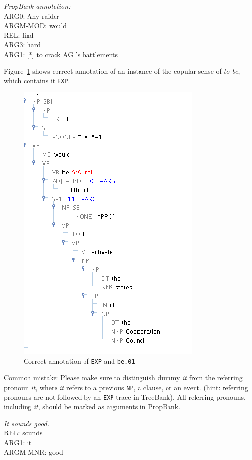 \documentclass[11pt]{report}
\begin{document}
\textit{PropBank annotation:}\\
ARG0:       Any raider\\
ARGM-MOD:   would\\
REL:        	find\\
ARG3:      	 hard\\
ARG1:	     	[*] to crack AG 's battlements\

Figure~\ref{fig: EXP} shows correct annotation of an instance of the copular sense of \textit{to be}, which contains it \texttt{EXP}. 

\begin{figure}[htbp]
\centering
\includegraphics[scale=0.6]{img/itexp.png}
\caption{Correct annotation of \texttt{EXP} and \texttt{be.01}}
\label{fig: EXP}
\end{figure}

Common mistake: Please make sure to distinguish dummy \textit{it} from the referring pronoun \textit{it}, where \textit{it} refers to a previous \texttt{NP}, a clause, or an event. (hint: referring pronouns are not followed by an \texttt{EXP} trace in TreeBank). All referring pronouns, including \textit{it}, should be marked as arguments in PropBank.

\textit{It sounds good.}\\
REL: 	sounds\\
ARG1:	 it\\
ARGM-MNR: 	good
\end{document}
